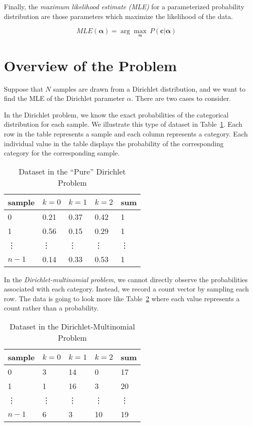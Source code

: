 \documentclass[twoside]{article}
\begin{document}
Finally, the \textit{maximum likelihood estimate (MLE)} for a parameterized probability distribution are those parameters which maximize the likelihood of the data.

\[MLE(\mathbf{\alpha})=\arg\max_\mathbf{\alpha}\ P(\mathbf{c}|\mathbf{\alpha})\]

\section{Overview of the Problem}

Suppose that $N$ samples are drawn from a Dirichlet distribution, and we want to find the MLE of the Dirichlet parameter $\alpha$.  There are two cases to consider.

In the Dirichlet problem, we know the exact probabilities of the categorical distribution for each sample. We illustrate this type of dataset in Table~\ref{tab:d}. Each row in the table represents a sample and each column represents a category. Each individual value in the table displays the probability of the corresponding category for the corresponding sample.

\begin{table}[h] \centering
\begin{tabular}{ l | l l l | l}
  sample & \(k=0\) & \(k=1\) & \(k=2\) & sum \\ \hline
  0 & 0.21 & 0.37 & 0.42 & 1\\
  1 & 0.56 & 0.15 & 0.29 & 1\\
  \vdots & \vdots & \vdots & \vdots & \vdots\\
  \(n-1\) & 0.14 & 0.33 & 0.53 & 1\\
\end{tabular}
\caption{Dataset in the ``Pure'' Dirichlet Problem}\label{tab:d}
\end{table}

In the \textit{Dirichlet-multinomial problem}, we cannot directly observe the probabilities associated with each category. Instead, we record a count vector by sampling each row. The data is going to look more like Table~\ref{tab:dm} where each value represents a count rather than a probability.

\begin{table}[h] \centering
\begin{tabular}{ l | l l l | l}
  sample & \(k=0\) & \(k=1\) & \(k=2\) & sum \\ \hline
  0 & 3 & 14 & 0 & 17\\
  1 & 1 & 16 & 3 & 20\\
  \vdots & \vdots & \vdots & \vdots & \vdots\\
  \(n-1\) & 6 & 3 & 10 & 19\\
\end{tabular}
\caption{Dataset in the Dirichlet-Multinomial Problem}\label{tab:dm}
\end{table}
\end{document}
